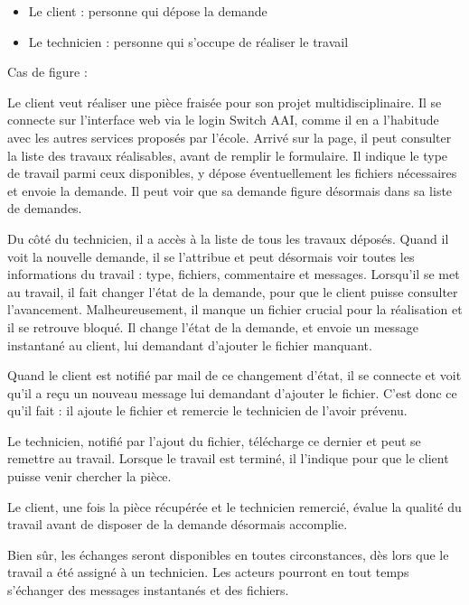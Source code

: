 \documentclass[
    iai, %
    eai, %
]{heig-tb}
\begin{document}
\begin{itemize}
  \item Le client : personne qui dépose la demande
  \item Le technicien : personne qui s'occupe de réaliser le travail
\end{itemize}

Cas de figure :

Le client veut réaliser une pièce fraisée pour son projet multidisciplinaire. Il se connecte sur l'interface web via le login Switch AAI, comme il en a l'habitude avec les autres services proposés par l'école. Arrivé sur la page, il peut consulter la liste des travaux réalisables, avant de remplir le formulaire. Il indique le type de travail parmi ceux disponibles, y dépose éventuellement les fichiers nécessaires et envoie la demande. Il peut voir que sa demande figure désormais dans sa liste de demandes.

Du côté du technicien, il a accès à la liste de tous les travaux déposés. Quand il voit la nouvelle demande, il se l'attribue et peut désormais voir toutes les informations du travail : type, fichiers, commentaire et messages. Lorsqu'il se met au travail, il fait changer l'état de la demande, pour que le client puisse consulter l'avancement.
Malheureusement, il manque un fichier crucial pour la réalisation et il se retrouve bloqué. Il change l'état de la demande, et envoie un message instantané au client, lui demandant d'ajouter le fichier manquant.

Quand le client est notifié par mail de ce changement d'état, il se connecte et voit qu'il a reçu un nouveau message lui demandant d'ajouter le fichier. C'est donc ce qu'il fait : il ajoute le fichier et remercie le technicien de l'avoir prévenu.

Le technicien, notifié par l'ajout du fichier, télécharge ce dernier et peut se remettre au travail. Lorsque le travail est terminé, il l'indique pour que le client puisse venir chercher la pièce.

Le client, une fois la pièce récupérée et le technicien remercié, évalue la qualité du travail avant de disposer de la demande désormais accomplie.


Bien sûr, les échanges seront disponibles en toutes circonstances, dès lors que le travail a été assigné à un technicien. Les acteurs pourront en tout temps s'échanger des messages instantanés et des fichiers.
\end{document}
